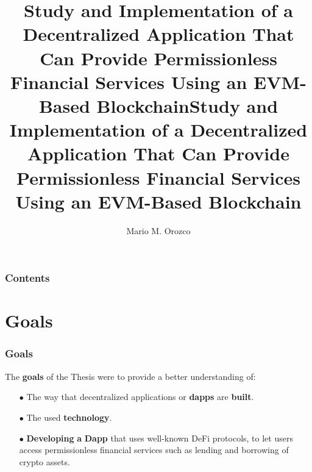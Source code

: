 \documentclass{beamer}
\title[]{Study and Implementation of a {Decentralized Application} That Can Provide {Permissionless Financial Services} Using an EVM-Based {Blockchain}} %
\author{Mario M. Orozco} %
\institute[HSRM] %
{
Bachelor Colloquium
\medskip
}
\begin{document}
\begin{frame}
\titlepage %
\end{frame}


\title[]{Study and Implementation of a \textbf{Decentralized Application} That Can Provide \textbf{Permissionless Financial Services} Using an EVM-Based \textbf{Blockchain}}

\begin{frame}
	\titlepage %
\end{frame}


\begin{frame}
\frametitle{Contents} %
\tableofcontents %
\end{frame}

\section{Goals}
\begin{frame}
\frametitle{Goals}
The \textbf{goals} of the Thesis were to provide a better understanding of:
\linebreak
\begin{itemize}
	\item[$\bullet$] The way that decentralized applications or \textbf{dapps} are \textbf{built}. \\ 
	\item[$\bullet$] The used \textbf{technology}.\\ 
	\item[$\bullet$] \textbf{Developing} \textbf{a} \textbf{Dapp} that uses well-known DeFi protocols, to let users access
	permissionless financial services such as lending and borrowing of crypto
	assets.\\ 
\end{itemize}
\end{frame}
\end{document}
